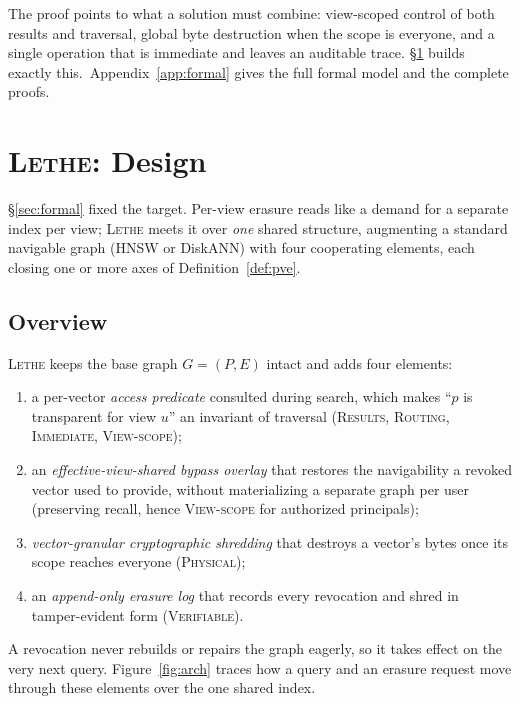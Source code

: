 \documentclass[sigconf, nonacm, review]{acmart}
\newif\ifextended\extendedtrue %
\begin{document}
The proof points to what a solution must combine: view-scoped control of
both results and traversal, global byte destruction when the scope is
everyone, and a single operation that is immediate and leaves an auditable
trace. \S\ref{sec:design} builds exactly this.\ifextended\ Appendix~\ref{app:formal} gives the full
formal model and the complete proofs.\fi

\section{\textsc{Lethe}: Design}
\label{sec:design}

\S\ref{sec:formal} fixed the target. Per-view erasure reads like a
demand for a separate index per view; \textsc{Lethe} meets it over \emph{one} shared
structure, augmenting a standard navigable graph (HNSW or DiskANN) with four
cooperating elements, each closing one or more axes of
Definition~\ref{def:pve}.

\subsection{Overview}

\textsc{Lethe} keeps the base graph $G=(P,E)$ intact and adds four elements:

\begin{enumerate}
\item a per-vector \emph{access predicate} consulted during search, which
  makes ``$p$ is transparent for view $u$'' an invariant of traversal
  (\textsc{Results}, \textsc{Routing}, \textsc{Immediate},
  \textsc{View-scope});
\item an \emph{effective-view-shared bypass overlay} that restores the
  navigability a revoked vector used to provide, without materializing a
  separate graph per user (preserving recall, hence \textsc{View-scope} for
  authorized principals);
\item \emph{vector-granular cryptographic shredding} that destroys a
  vector's bytes once its scope reaches everyone (\textsc{Physical});
\item an \emph{append-only erasure log} that records every revocation and
  shred in tamper-evident form (\textsc{Verifiable}).
\end{enumerate}

A revocation never rebuilds or repairs the graph eagerly, so it takes effect
on the very next query. Figure~\ref{fig:arch} traces how a query and an
erasure request move through these elements over the one shared index.
\end{document}
